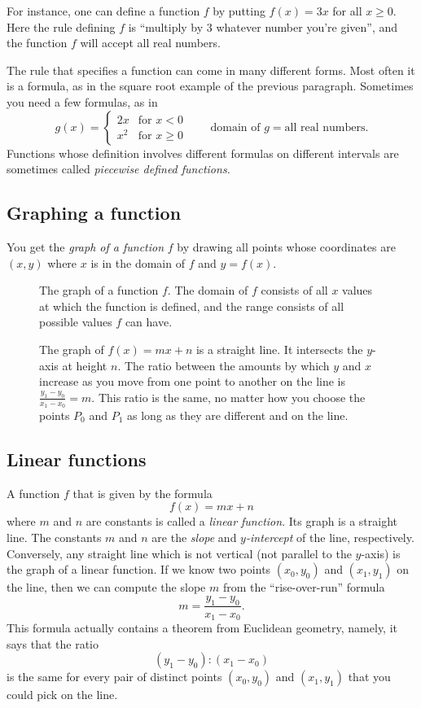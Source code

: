 \medskip

For instance, one can define a function $f$ by putting $f(x) = 3x$ for all
$x\geq0$.  Here the rule defining $f$ is ``multiply by 3 whatever
number you're given'', and the function $f$ will accept all real numbers.


The rule that specifies a function can come in many different forms.  Most
often it is a formula, as in the square root example of the previous paragraph.
Sometimes you need a few formulas, as in
\[
g(x) =
\begin{cases}
  2x & \text{for } x<0 \\
  x^2 & \text{for }x\geq0
\end{cases}
\qquad
\text{domain of $g$} = \text{all real numbers.}
\]
Functions whose definition involves different formulas on different
intervals are sometimes called \emph{piecewise defined functions.}

\subsection{Graphing a function} 
You get the \emph{graph of a function} $f$ by drawing all points whose
coordinates are $(x,y)$ where $x$ is in the domain of $f$ and $y = f(x)$.
\begin{figure}[h]
  \centering
  
  \caption{The graph of a function $f$. The domain of $f$ consists
    of all $x$ values at which the function is defined, and the range consists
    of all possible values $f$ can have.}
  \label{fig:01graphOFf}
\end{figure}

\begin{figure}[t]
  \centering
  
  \caption{The graph of $f(x) = mx+n$ is a straight line.
    It intersects the $y$-axis at height $n$.
    The ratio between the amounts by which $y$ and $x$ increase as you
    move from one point to another on the line is
    $\frac{y_1-y_0}{x_1-x_0} = m$.  This ratio is the same, no matter
    how you choose the points $P_0$ and $P_1$ as long as they are different and on
    the line.}\label{fig:01line}
\end{figure}
\subsection{Linear functions} 
A function $f$ that is given by the formula
\[
f(x) = mx + n
\]
where $m$ and $n$ are constants is called a \emph{linear function}.  Its graph
is a straight line.  The constants $m$ and $n$ are the \emph{slope} and
\emph{$y$-intercept} of the line, respectively.  Conversely, any straight line
which is not vertical (not parallel to the $y$-axis) is the graph of a linear
function.  If we know two points $(x_0, y_0)$ and $(x_1, y_1)$ on the line, then
we can compute the slope $m$ from the ``rise-over-run'' formula
\[
m = \frac{y_1-y_0}{x_1-x_0}.
\]
This formula actually contains a theorem from Euclidean geometry,
namely, it says that the ratio
\[
(y_1-y_0):(x_1-x_0)
\]
is the same for every pair of distinct points $(x_0, y_0)$ and $(x_1, y_1)$
that you could pick on the line.


